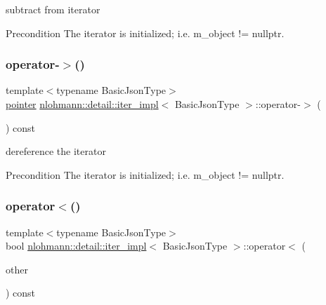 subtract from iterator 

\begin{DoxyPrecond}{Precondition}
The iterator is initialized; i.\+e. {\ttfamily m\+\_\+object != nullptr}. 
\end{DoxyPrecond}
\mbox{\label{classnlohmann_1_1detail_1_1iter__impl_a6da3d2b34528aff328f3dcb513076dec}} 
\subsubsection{\texorpdfstring{operator-\/$>$()}{operator->()}}
{\footnotesize\ttfamily template$<$typename Basic\+Json\+Type$>$ \\
\mbox{\hyperlink{classnlohmann_1_1detail_1_1iter__impl_a69e52f890ce8c556fd68ce109e24b360}{pointer}} \mbox{\hyperlink{classnlohmann_1_1detail_1_1iter__impl}{nlohmann\+::detail\+::iter\+\_\+impl}}$<$ Basic\+Json\+Type $>$\+::operator-\/$>$ (\begin{DoxyParamCaption}{ }\end{DoxyParamCaption}) const\hspace{0.3cm}{\ttfamily [inline]}}



dereference the iterator 

\begin{DoxyPrecond}{Precondition}
The iterator is initialized; i.\+e. {\ttfamily m\+\_\+object != nullptr}. 
\end{DoxyPrecond}
\mbox{\label{classnlohmann_1_1detail_1_1iter__impl_a0d14cd76203e00bdcef6a64a5d055cc7}} 
\subsubsection{\texorpdfstring{operator$<$()}{operator<()}}
{\footnotesize\ttfamily template$<$typename Basic\+Json\+Type$>$ \\
bool \mbox{\hyperlink{classnlohmann_1_1detail_1_1iter__impl}{nlohmann\+::detail\+::iter\+\_\+impl}}$<$ Basic\+Json\+Type $>$\+::operator$<$ (\begin{DoxyParamCaption}\item[{const \mbox{\hyperlink{classnlohmann_1_1detail_1_1iter__impl}{iter\+\_\+impl}}$<$ Basic\+Json\+Type $>$ \&}]{other }\end{DoxyParamCaption}) const\hspace{0.3cm}{\ttfamily [inline]}}



